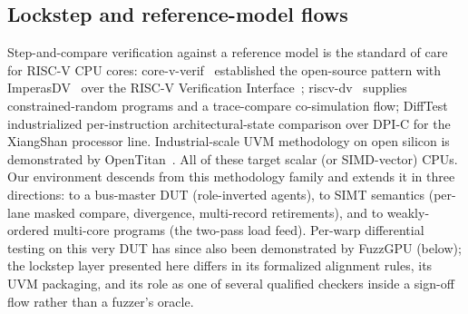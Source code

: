 \documentclass[conference]{IEEEtran}
\begin{document}
\subsection{Lockstep and reference-model flows}
Step-and-compare verification against a reference model is the standard
of care for RISC-V CPU cores: core-v-verif~\cite{corevverif} established
the open-source pattern with ImperasDV~\cite{imperasdv} over the
RISC-V Verification Interface~\cite{rvvi};
riscv-dv~\cite{riscvdv} supplies constrained-random programs and a
trace-compare co-simulation flow; DiffTest~\cite{difftest}
industrialized per-instruction architectural-state comparison over
DPI-C for the XiangShan processor line. Industrial-scale UVM
methodology on open silicon is demonstrated by
OpenTitan~\cite{opentitan}.
All of these target scalar (or
SIMD-vector) CPUs. Our environment descends from this methodology family
and extends it in three directions: to a bus-master DUT (role-inverted
agents), to SIMT semantics (per-lane masked compare, divergence,
multi-record retirements), and to weakly-ordered multi-core programs
(the two-pass load feed). Per-warp differential testing on this very DUT
has since also been demonstrated by FuzzGPU (below); the lockstep layer
presented here differs in its formalized alignment rules, its UVM
packaging, and its role as one of several qualified checkers inside a
sign-off flow rather than a fuzzer's oracle.
\end{document}
